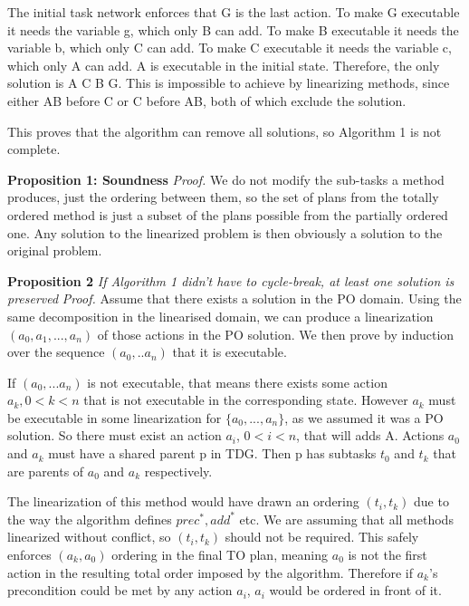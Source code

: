 	The initial task network enforces that G is the last action.
	To make G executable it needs the variable g, which only B can add.
	To make B executable it needs the variable b, which only C can add.
	To make C executable it needs the variable c, which only A can add.
	A is executable in the initial state.
	Therefore, the only solution is A C B G. This is impossible to achieve by linearizing methods, since either AB before C or C before AB, both of which exclude the solution. 
	
	This proves that the algorithm can remove all solutions, so Algorithm 1 is not complete.
	
	
\textbf{Proposition 1: Soundness}  \newline
\textit{Proof.}
We do not modify the sub-tasks a method produces, just the ordering between them, so the set of plans from the totally ordered method is just a subset of the plans possible from the partially ordered one. Any solution to the linearized problem is then obviously a solution to the original problem.



\textbf{Proposition 2} \textit{If Algorithm 1 didn't have to cycle-break, at least one solution is preserved} \newline
\textit{Proof.}
	Assume that there exists a solution in the PO domain. Using the same decomposition in the linearised domain, we can produce a linearization $(a_0, a_1, ..., a_n)$ of those actions in the PO solution. We then prove by induction over the sequence $(a_0, .. a_n)$ that it is executable.
 
	If $(a_0, ... a_n)$ is not executable, that means there exists some action $a_k,  0 < k < n$ that is not executable in the corresponding state.
	However $a_k$ must be executable in some linearization for $\{a_0, ..., a_n\}$, as we assumed it was a PO solution. So there must exist an action $a_i$, $0 < i < n$, that will adds A. Actions $a_0$ and $a_k$ must have a shared parent p in TDG. Then p has subtasks $t_0$ and $t_k$ that are parents of $a_0$ and $a_k$ respectively. 
	
	The linearization of this method would have drawn an ordering $(t_i, t_k)$ due to the way the algorithm defines $prec^{*}, add^{*}$ etc. We are assuming that all methods linearized without conflict, so $(t_i, t_k)$ should not be required. This safely enforces $(a_k, a_0)$ ordering in the final TO plan, meaning $a_0$ is not the first action in the resulting total order imposed by the algorithm. Therefore if $a_k$’s precondition could be met by any action $a_i$, $a_i$ would be ordered in front of it. 
	
